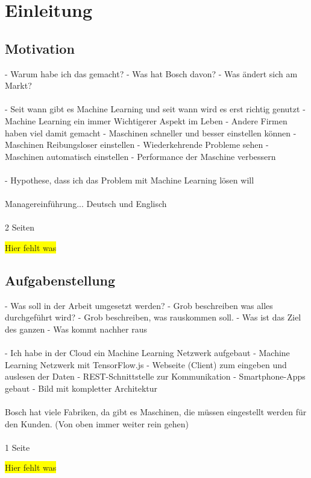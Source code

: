 \chapter{Einleitung}
\label{ch:einleitung}

\section{Motivation}
\label{sec:motivation}
- Warum habe ich das gemacht?
- Was hat Bosch davon?
- Was ändert sich am Markt?
\\ \\
- Seit wann gibt es Machine Learning und seit wann wird es erst richtig genutzt
- Machine Learning ein immer Wichtigerer Aspekt im Leben
- Andere Firmen haben viel damit gemacht
- Maschinen schneller und besser einstellen können
- Maschinen Reibungsloser einstellen
- Wiederkehrende Probleme sehen
- Maschinen automatisch einstellen
- Performance der Maschine verbessern
\\ \\
- Hypothese, dass ich das Problem mit Machine Learning lösen will
\\ \\
Managereinführung... Deutsch und Englisch
\\ \\
2 Seiten

\colorbox{yellow}{Hier fehlt was}

\section{Aufgabenstellung}
\label{sec:aufgabenstellung}
- Was soll in der Arbeit umgesetzt werden?
- Grob beschreiben was alles durchgeführt wird?
- Grob beschreiben, was rauskommen soll.
- Was ist das Ziel des ganzen
- Was kommt nachher raus
\\ \\
- Ich habe in der Cloud ein Machine Learning Netzwerk aufgebaut
- Machine Learning Netzwerk mit TensorFlow.js
- Webseite (Client) zum eingeben und auslesen der Daten
- REST-Schnittstelle zur Kommunikation
- Smartphone-Apps gebaut
- Bild mit kompletter Architektur
\\ \\
Bosch hat viele Fabriken, da gibt es Maschinen, die müssen eingestellt werden für den Kunden. (Von oben immer weiter
rein gehen)
\\ \\
1 Seite

\colorbox{yellow}{Hier fehlt was}

